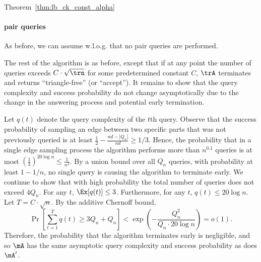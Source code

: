 \begin{proofof}{Theorem~\ref{thm:lb_ck_const_alpha}}
\paragraph{pair queries} As before, we can assume w.l.o.g. that no pair queries are performed.

The rest of the algorithm is as before, except that if at any point the number of queries exceeds $C\cdot \sqrt{\trn}$ for some predetermined constant $C$, $\trA$ terminates and returns 
``triangle-free'' (or ``accept''). It remains to show that the query complexity and success probability do not change asymptotically due to the change in the answering process and potential early termination.

Let $q(t)$ denote the query complexity 
of the $t$th query. 
Observe that the success probability  of sampling an edge   between two specific parts that was not previously queried is at least $\frac{1}{2}-\frac{nd-|Q_n|}{nd}\geq 1/3$. 
Hence, 
the probability that in a single edge sampling process the algorithm performs more than $n^{0.1}$ queries is at most $(\frac{1}{3})^{20\log n}\leq \frac{1}{n^2}$.
By a union bound over all $Q_n$ queries,   with probability at least $1-1/n$, no single query is causing the algorithm to terminate early. We continue to show that with high probability the total  number of queries  does not exceed $4Q_n$.
For any $t$,  $\Ex[q(t)]\leq 3$. 
Furthermore, for any $t$, $q(t)\leq 20\log n.$ 
Let $T=C\cdot \sqrt n$. By the additive Chernoff bound,
\[
 \Pr\left[\sum_{t=1}^{T} q(t)\geq 3Q_n+Q_n \right] < \exp\left( -\frac{Q_n^2}{Q_n\cdot 20\log n} \right)=o(1).
\]
Therefore, the probability that the algorithm terminates early is negligible, and so $\mA$ has the same asymptotic query complexity and success probability as does $\mA'$.
\fi
%
\end{proofof}
